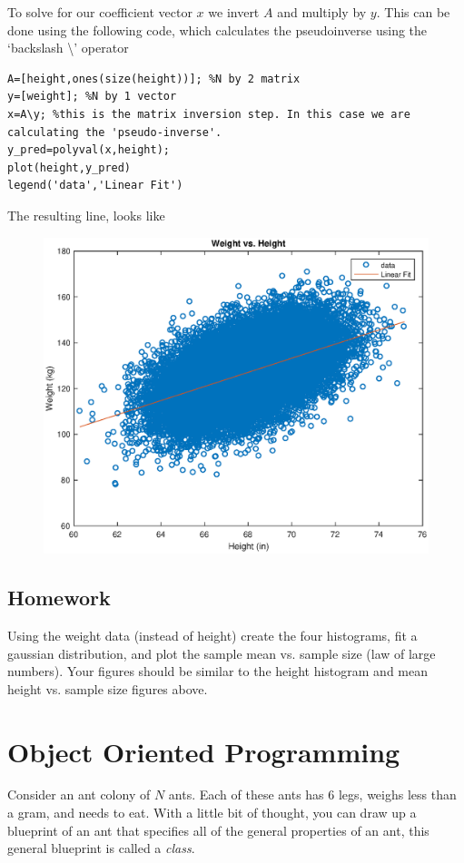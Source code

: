 \documentclass[12pt]{article}
\begin{document}
To solve for our coefficient vector $x$ we invert $A$ and multiply by $y$. This can be done using the following code, which calculates the pseudoinverse using the `backslash \textbackslash' operator

\begin{lstlisting}[frame=single]
%A*x=y or height*x=weight. To solve for x, we invert
A=[height,ones(size(height))]; %N by 2 matrix
y=[weight]; %N by 1 vector
x=A\y; %this is the matrix inversion step. In this case we are calculating the 'pseudo-inverse'.
y_pred=polyval(x,height);
plot(height,y_pred)
legend('data','Linear Fit')
\end{lstlisting}

The resulting line, looks like

\begin{figure}[H]
\centering
\includegraphics[width=0.75\linewidth]{linearFitHeightWeight.eps}
\end{figure}

\subsection{Homework}
Using the weight data (instead of height) create the four histograms, fit a gaussian distribution, and plot the sample mean vs. sample size (law of large numbers). Your figures should be similar to the height histogram and mean height vs. sample size figures above.

\newpage

\section{Object Oriented Programming}

Consider an ant colony of $N$ ants. Each of these ants has 6 legs, weighs less than a gram, and needs to eat. With a little bit of thought, you can draw up a blueprint of an ant that specifies all of the general properties of an ant, this general blueprint is called a \textit{class}. 
\end{document}
